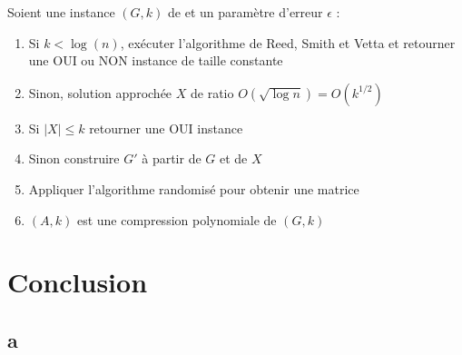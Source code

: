 \documentclass[9pt]{beamer}
\begin{document}
\begin{frame}
    Soient une instance $(G, k)$ de \oct et un paramètre d'erreur $\epsilon$ :
    \vfill
    \begin{enumerate}
        \item Si $k < \log(n)$, exécuter l'algorithme de Reed, Smith et Vetta et retourner une OUI
            ou NON instance de taille constante
            \pause
        \item Sinon, solution approchée $X$ de ratio $O(\sqrt{\log n}) = O(k^{1/2})$
            \pause
        \item Si $|X| \leq k$ retourner une OUI instance
            \pause
        \item Sinon construire $G'$ à partir de $G$ et de $X$
            \pause
        \item Appliquer l'algorithme randomisé pour obtenir une matrice
            \pause
        \item $(A, k)$ est une compression polynomiale de $(G, k)$
    \end{enumerate}
\end{frame}

\section{Conclusion}
\subsection*{a}

\begin{frame}
\end{frame}
\end{document}
